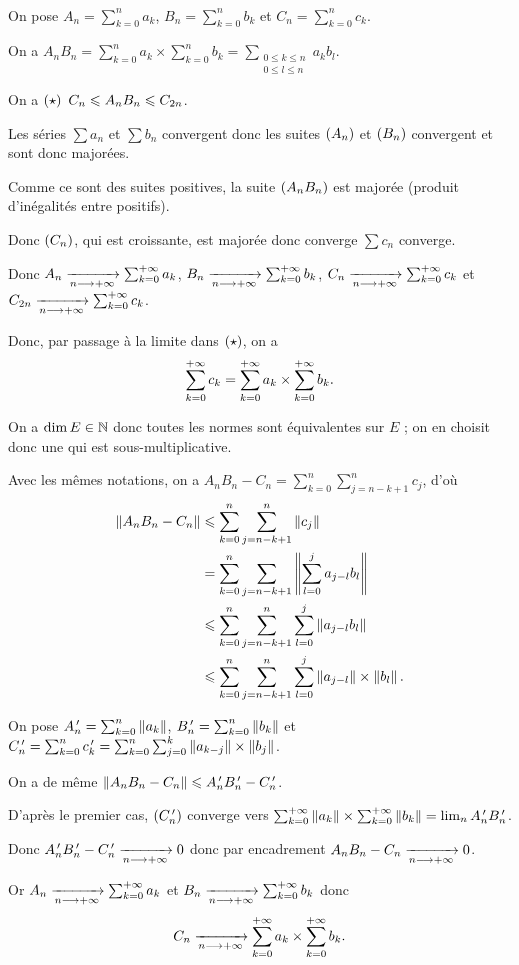 \begin{dem}[Premier cas : \(E=\R\) et \(\paren{a_n},\paren{b_n}\) positives]~\\
On pose \(A_n=\sum_{k=0}^na_k\), \(B_n=\sum_{k=0}^nb_k\) et \(C_n=\sum_{k=0}^nc_k\).

On a \(A_nB_n=\sum_{k=0}^na_k\times\sum_{k=0}^nb_k=\sum_{\substack{0\leq k\leq n \\ 0\leq l\leq n}}a_kb_l\).

On a \(\left(\star\right)~C_n\leqslant A_nB_n\leqslant C_{2n}\).

Les séries \(\sum a_n\) et \(\sum b_n\) convergent donc les suites \(\left(A_n\right)\) et \(\left(B_n\right)\) convergent et sont donc majorées.

Comme ce sont des suites positives, la suite \(\left(A_nB_n\right)\) est majorée (produit d'inégalités entre positifs).

Donc \(\left(C_n\right)\), qui est croissante, est majorée donc converge \ie \(\sum c_n\) converge.

Donc \(A_n\xrightarrow[n\longrightarrow+\infty]{}\sum_{k=0}^{+\infty}a_k\), \(B_n\xrightarrow[n\longrightarrow+\infty]{}\sum_{k=0}^{+\infty}b_k\), \(C_n\xrightarrow[n\longrightarrow+\infty]{}\sum_{k=0}^{+\infty}c_k\) et \(C_{2n}\xrightarrow[n\longrightarrow+\infty]{}\sum_{k=0}^{+\infty}c_k\).

Donc, par passage à la limite dans \(\left(\star\right)\), on a \[\sum_{k=0}^{+\infty}c_k=\sum_{k=0}^{+\infty}a_k\times\sum_{k=0}^{+\infty}b_k.\]
\end{dem}

\begin{dem}
On a \(\dim E\in\mathbb{N}\) donc toutes les normes sont équivalentes sur \(E\) ; on en choisit donc une qui est sous-multiplicative.

Avec les mêmes notations, on a \(A_nB_n-C_n=\sum_{k=0}^n\sum_{j=n-k+1}^nc_j\), d'où \[\begin{aligned}
\norme{A_nB_n-C_n}&\leq\sum_{k=0}^n\sum_{j=n-k+1}^n\norme{c_j} \\
&=\sum_{k=0}^n\sum_{j=n-k+1}\norme{\sum_{l=0}^ja_{j-l}b_l} \\
&\leq\sum_{k=0}^n\sum_{j=n-k+1}^n\sum_{l=0}^j\norme{a_{j-l}b_l} \\
&\leq\sum_{k=0}^n\sum_{j=n-k+1}^n\sum_{l=0}^j\norme{a_{j-l}}\times\norme{b_l}.
\end{aligned}\]

On pose \(A_n\prim=\sum_{k=0}^n\norme{a_k}\), \(B_n\prim=\sum_{k=0}^n\norme{b_k}\) et \(C_n\prim=\sum_{k=0}^nc_k\prim=\sum_{k=0}^n\sum_{j=0}^k\norme{a_{k-j}}\times\norme{b_j}\).

On a de même \(\norme{A_nB_n-C_n}\leq A_n\prim B_n\prim-C_n\prim\).

D'après le premier cas, \(\left(C_n^{\,\prime}\right)\) converge vers \(\sum_{k=0}^{\pinf}\norme{a_k}\times\sum_{k=0}^{\pinf}\norme{b_k}=\lim_nA_n\prim B_n\prim\).

Donc \(A_n^{\,\prime} B_n^{\,\prime}-C_n^{\,\prime}\xrightarrow[n\longrightarrow+\infty]{}0\) donc par encadrement \(A_nB_n-C_n\xrightarrow[n\longrightarrow+\infty]{}0\).

Or \(A_n\xrightarrow[n\longrightarrow+\infty]{}\sum_{k=0}^{+\infty}a_k\) et \(B_n\xrightarrow[n\longrightarrow+\infty]{}\sum_{k=0}^{+\infty}b_k\) donc \[C_n\xrightarrow[n\longrightarrow+\infty]{}\sum_{k=0}^{+\infty}a_k\times\sum_{k=0}^{+\infty}b_k.\]
\end{dem}

